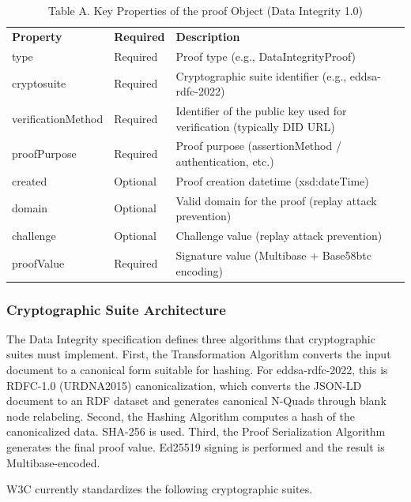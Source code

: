 \documentclass[conference]{IEEEtran}
\begin{document}
\begin{table}[!t]
\centering
\caption{Table A. Key Properties of the proof Object (Data Integrity 1.0)}\label{tab:A}
\footnotesize
\begin{tabular}{ll>{\raggedright\arraybackslash}p{}}
\toprule

\textbf{Property} & \textbf{Required} & \textbf{Description}\tabularnewline
type & Required & Proof type (e.g., DataIntegrityProof)\tabularnewline
cryptosuite & Required & Cryptographic suite identifier (e.g., eddsa-rdfc-2022)\tabularnewline
verificationMethod & Required & Identifier of the public key used for verification (typically DID URL)\tabularnewline
proofPurpose & Required & Proof purpose (assertionMethod / authentication, etc.)\tabularnewline
created & Optional & Proof creation datetime (xsd:dateTime)\tabularnewline
domain & Optional & Valid domain for the proof (replay attack prevention)\tabularnewline
challenge & Optional & Challenge value (replay attack prevention)\tabularnewline
proofValue & Required & Signature value (Multibase + Base58btc encoding)\tabularnewline
\bottomrule
\end{tabular}
\end{table}

\subsubsection{Cryptographic Suite Architecture}

The Data Integrity specification defines three algorithms that cryptographic suites must implement. First, the Transformation Algorithm converts the input document to a canonical form suitable for hashing. For eddsa-rdfc-2022, this is RDFC-1.0 (URDNA2015) canonicalization, which converts the JSON-LD document to an RDF dataset and generates canonical N-Quads through blank node relabeling. Second, the Hashing Algorithm computes a hash of the canonicalized data. SHA-256 is used. Third, the Proof Serialization Algorithm generates the final proof value. Ed25519 signing is performed and the result is Multibase-encoded.

W3C currently standardizes the following cryptographic suites.


\begin{table}[!t]
\centering
\caption{Table B. W3C Data Integrity Cryptographic Suites}\label{tab:B}
\footnotesize
{}
\end{table}
\end{document}
